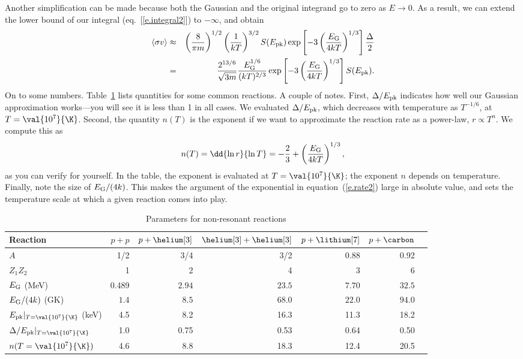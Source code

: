 Another simplification can be made because both the Gaussian and the original integrand go to zero as $E\to 0$.  As a result, we can extend the lower bound of our integral (eq.~[\ref{e.integral2}]) to $-\infty$, and obtain
\begin{eqnarray}\label{e.rate2}
\langle\sigma v\rangle &\approx& \left(\frac{8}{\pi m}\right)^{1/2}\left(\frac{1}{kT}\right)^{3/2} S(E_{\mathrm{pk}}) \exp\left[-3\left(\frac{E_{\mathrm{G}}}{4kT}\right)^{1/3}\right]\frac{\Delta}{2}\nonumber\\
 &=& \frac{2^{13/6}}{\sqrt{3m}}\frac{E_{\mathrm{G}}^{1/6}}{(kT)^{2/3}} \exp\left[-3\left(\frac{E_{\mathrm{G}}}{4kT}\right)^{1/3}\right]  S(E_{\mathrm{pk}}).
\end{eqnarray}
On to some numbers. Table~\ref{t.reaction} lists quantities for some common reactions. A couple of notes. First, $\Delta/E_{\mathrm{pk}}$ indicates how well our Gaussian approximation works---you will see it is less than 1 in all cases. We evaluated $\Delta/E_{\mathrm{pk}}$, which decreases with temperature as $T^{-1/6}$, at $T = \val{10^{7}}{\K}$. Second, the quantity $n(T)$ is the exponent if we want to approximate the reaction rate as a power-law, $r\propto T^{n}$.  We compute this as 
\begin{equation}\label{e.exponent}
 n(T) = \dd{\ln r}{\ln T} = -\frac{2}{3} + \left(\frac{\EG}{4kT}\right)^{1/3},
\end{equation}
as you can verify for yourself. In the table, the exponent is evaluated at $T = \val{10^{7}}{\K}$; the exponent $n$ depends on temperature. Finally, note the size of $E_{\mathrm{G}}/(4k)$.  This makes the argument of the exponential in equation~(\ref{e.rate2}) large in absolute value, and sets the temperature scale at which a given reaction comes into play.
 
\begin{table}[hb]
\forcerectofloat
\caption{\label{t.reaction} Parameters for non-resonant reactions}
\begin{tabular}{lrrrrrr}
\hline
Reaction & $p+p$ & $p+\helium[3]$ & $\helium[3]+\helium[3]$ & $p+\lithium[7]$ & $p+\carbon$\\
\hline\hline
$A$ & 1/2 & 3/4 & 3/2 & 0.88 & 0.92 \\
$Z_{1}Z_{2}$ & 1 & 2 & 4 & 3 & 6 \\
$E_{\mathrm{G}}$ (MeV) & 0.489 & $2.94$ & $23.5$ & $7.70$ & $32.5$\\
$E_{\mathrm{G}}/(4k)$ (GK) & $1.4$ & $8.5$ & $68.0$ & $22.0$ & $94.0$ \\
$\Epk|_{T=\val{10^{7}}{\K}}$ (keV) & 4.5 & 8.2 & 16.3 & 11.3 & 18.2\\
$\Delta/\Epk|_{T=\val{10^{7}}{\K}}$ & 1.0 & 0.75 & 0.53 & 0.64 & 0.50 \\
$n(T = \val{10^{7}}{\K})$ & 4.6 & 8.8 & 18.3 & 12.4 & 20.5\\
\hline
\end{tabular}
\end{table}
